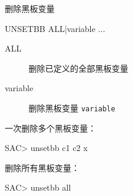 \label{cmd:unsetbb}

删除黑板变量

\begin{SACSTX}
UNSETBB ALL|variable ...
\end{SACSTX}

\begin{description}
\item [ALL] 删除已定义的全部黑板变量
\item [variable] 删除黑板变量 \texttt{variable}
\end{description}

一次删除多个黑板变量：
\begin{SACCode}
SAC> unsetbb c1 c2 x
\end{SACCode}

删除所有黑板变量：
\begin{SACCode}
SAC> unsetbb all
\end{SACCode}
